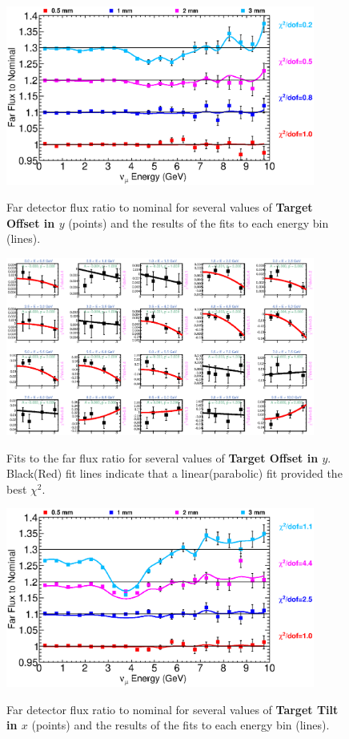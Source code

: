 \begin{figure}[ht]
  \begin{center}
    {\includegraphics[width=4.0in]{figures/TargetYOffset_far_summary.eps}}
  \end{center}
\caption{ Far detector flux ratio to nominal for several values of {\bf Target Offset in $y$} (points) and the results of the fits to each energy bin (lines).}
\end{figure}

\begin{figure}[hb]
  \begin{center}
    {\includegraphics[width=4.0in]{figures/TargetYOffset_far_fits.eps}}
  \end{center}
\caption{ Fits to the far flux ratio for several values of {\bf Target Offset in $y$}. Black(Red) fit lines indicate that a linear(parabolic) fit provided the best $\chi^2$. }
\end{figure}

\begin{figure}[ht]
  \begin{center}
    {\includegraphics[width=4.0in]{figures/TargetXTilt_far_summary.eps}}
  \end{center}
\caption{ Far detector flux ratio to nominal for several values of {\bf Target Tilt in $x$} (points) and the results of the fits to each energy bin (lines).}
\end{figure}

